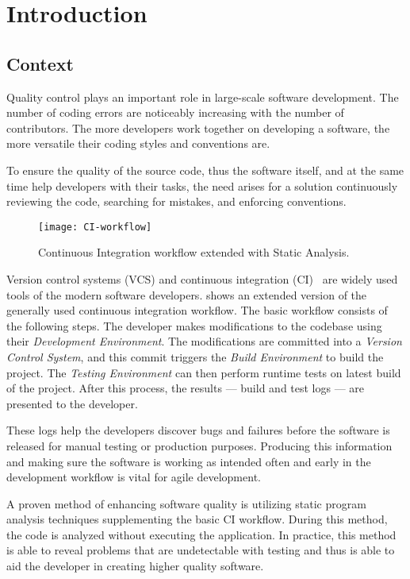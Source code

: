 \chapter{Introduction}
\label{chap:introduction}

\section{Context}

Quality control plays an important role in large-scale software development. The number of coding errors are noticeably increasing with the number of contributors. The more developers work together on developing a software, the more versatile their coding styles and conventions are.

To ensure the quality of the source code, thus the software itself, and at the same time help developers with their tasks, the need arises for a solution continuously reviewing the code, searching for mistakes, and enforcing conventions.

\begin{figure}[!ht]
	\centering
	\texttt{[image: CI-workflow]}
	\caption{Continuous Integration workflow extended with Static Analysis.}
	\label{fig:CI-workflow}
\end{figure}

Version control systems (VCS) and continuous integration (CI)~\cite{CI} are widely used tools of the modern software developers.  shows an extended version of the generally used continuous integration workflow.
The basic workflow consists of the following steps. The developer makes modifications to the codebase using their \textit{Development Environment}. The modifications are committed into a \textit{Version Control System}, and this commit triggers the \textit{Build Environment} to build the project. The \textit{Testing Environment} can then perform runtime tests on latest build of the project. After this process, the results --- build and test logs --- are presented to the developer.

These logs help the developers discover bugs and failures before the software is released for manual testing or production purposes. Producing this information and making sure the software is working as intended often and early in the development workflow is vital for agile development.

A proven method of enhancing software quality is utilizing static program analysis techniques supplementing the basic CI workflow. During this method, the code is analyzed without executing the application. In practice, this method is able to reveal problems that are undetectable with testing and thus is able to aid the developer in creating higher quality software.


